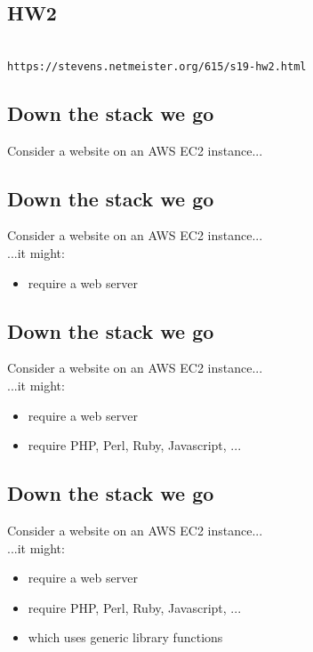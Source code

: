 \documentclass[xga]{xdvislides}
\begin{document}
\subsection{HW2}
\\

\vspace{2in}
\verb+https://stevens.netmeister.org/615/s19-hw2.html+

\subsection{Down the stack we go}
Consider a website on an AWS EC2 instance...

\subsection{Down the stack we go}
Consider a website on an AWS EC2 instance...
\\

...it might:

\begin{itemize}
	\item require a web server
\end{itemize}


\subsection{Down the stack we go}
Consider a website on an AWS EC2 instance...
\\

...it might:

\begin{itemize}
	\item require a web server
	\item require PHP, Perl, Ruby, Javascript, ...
\end{itemize}

\subsection{Down the stack we go}
Consider a website on an AWS EC2 instance...
\\

...it might:

\begin{itemize}
	\item require a web server
	\item require PHP, Perl, Ruby, Javascript, ...
	\item which uses generic library functions
\end{itemize}
\end{document}
